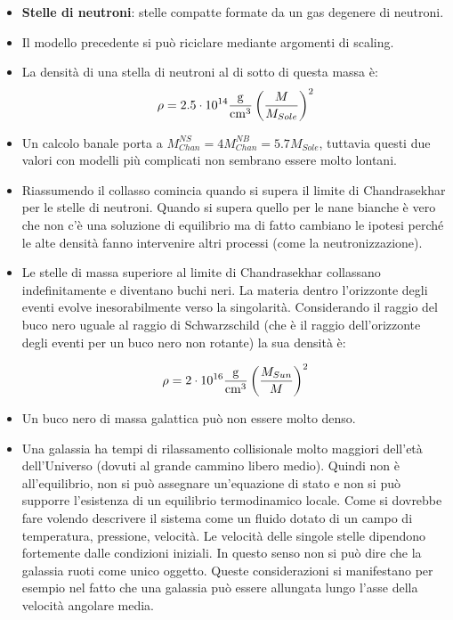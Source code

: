 \documentclass[11pt,a4paper]{article}
\begin{document}
\begin{itemize}
\item \textbf{Stelle di neutroni}: stelle compatte formate da un gas degenere di neutroni.

\item Il modello precedente si può riciclare mediante argomenti di scaling.

\item La densità di una stella di neutroni al di sotto di questa massa è:
\begin{equation}
\rho = 2.5 \cdot 10^{14} \si{\frac{\g}{\cm^3}} \left( \frac{M}{M_{Sole}} \right)^2
\end{equation}

\item Un calcolo banale porta a $M_{Chan}^{NS} = 4 M_{Chan}^{NB} = 5.7 M_{Sole}$, tuttavia questi due valori con modelli più complicati non sembrano essere molto lontani. 

\item Riassumendo il collasso comincia quando si supera il limite di Chandrasekhar per le stelle di neutroni. Quando si supera quello per le nane bianche è vero che non c'è una soluzione di equilibrio ma di fatto cambiano le ipotesi perché le alte densità fanno intervenire altri processi (come la neutronizzazione).

\item Le stelle di massa superiore al limite di Chandrasekhar collassano indefinitamente e diventano buchi neri. La materia dentro l'orizzonte degli eventi evolve inesorabilmente verso la singolarità. Considerando il raggio del buco nero uguale al raggio di Schwarzschild (che è il raggio dell'orizzonte degli eventi per un buco nero non rotante) la sua densità è:

\begin{equation}
\rho = 2 \cdot 10^{16} \si{\frac{\g}{\cm^3}} \left( \frac{M_{Sun}}{M} \right)^2 
\end{equation}

\item Un buco nero di massa galattica può non essere molto denso.

\item Una galassia ha tempi di rilassamento collisionale molto maggiori dell'età dell'Universo (dovuti al grande cammino libero medio). Quindi non è all'equilibrio, non si può assegnare un'equazione di stato e non si può supporre l'esistenza di un equilibrio termodinamico locale. Come si dovrebbe fare volendo descrivere il sistema come un fluido dotato di un campo di temperatura, pressione, velocità. Le velocità delle singole stelle dipendono fortemente dalle condizioni iniziali. In questo senso non si può dire che la galassia ruoti come unico oggetto. Queste considerazioni si manifestano per esempio nel fatto che una galassia può essere allungata lungo l'asse della velocità angolare media.


\end{itemize}
\end{document}
